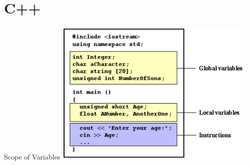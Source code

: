 \documentclass[10pt]{beamer}
\begin{document}
% 
% 
% 
% 





\section{C++}

\begin{frame}{Scope of Variables}
\includegraphics[height=7cm]{img/scope_of_variables.pdf} 
\end{frame}
\end{document}
